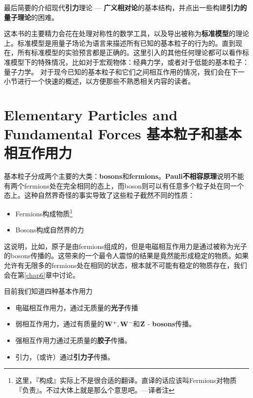 最后简要的介绍现代{\bf 引力}理论 --- {\bf 广义相对论}的基本结构，并点出一些构建{\bf 引力的量子理论}的困难。

这本书的主要精力会花在处理对称性的数学工具，以及导出被称为{\bf 标准模型}的理论上。标准模型是用量子场论为语言来描述所有已知的基本粒子的行为的。直到现在，所有标准模型的实验预言都是正确的。这里引入的其他任何理论都可以看作标准模型下的特殊情况，比如对于宏观物体：经典力学，或者对于低能的基本粒子：量子力学。
对于现今已知的基本粒子和它们之间相互作用的情况，我们会在下一小节进行一个快速的概述，以方便那些不熟悉相关内容的读者。

\section[基本粒子和基本相互作用力]{Elementary Particles and Fundamental Forces 基本粒子和基本相互作用力}\label{sec1.3}

基本粒子分成两个主要的大类：{\bf bosons}和{\bf fermions}。{\bf Pauli不相容原理}说明不能有两个fermions处在完全相同的态上，而boson则可以有任意多个粒子处在同一个态上。这种自然界奇怪的事实导致了这些粒子截然不同的性质：

\begin{itemize}
\item Fermions构成物质\footnote{这里，『构成』实际上不是很合适的翻译。直译的话应该叫Fermions对物质『负责』。不过大体上就是那么个意思吧。---译者注}
\item Bosons构成自然界的力
\end{itemize}

这说明，比如，原子是由fermions组成的，但是电磁相互作用力是通过被称为光子的bosons传播的。这带来的一个最令人震惊的结果是竟然能形成稳定的物质。如果允许有无限多的fermions处在相同的状态，根本就不可能有稳定的物质存在，我们会在第\ref{chap6}章中讨论。

目前我们知道四种基本作用力

\begin{itemize}
\item 电磁相互作用力，通过无质量的{\bf 光子}传播
\item 弱相互作用力，通过有质量的$\bf W^+, W^-$和$\bf Z$ - {\bf bosons}传播。
\item 强相互作用力通过无质量的{\bf 胶子}传播。
\item 引力，（或许）通过{\bf 引力子}传播。
\end{itemize}

